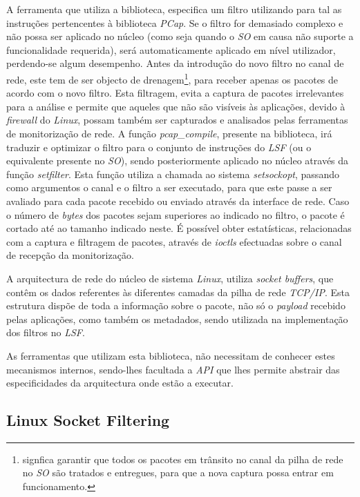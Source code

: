 A ferramenta que utiliza a biblioteca, especifica um filtro utilizando para tal as instruções pertencentes à biblioteca \textit{PCap}.
Se o filtro for demasiado complexo e não possa ser aplicado no núcleo (como seja quando o \textit{SO} em causa não suporte a funcionalidade requerida), será automaticamente aplicado em nível utilizador, perdendo-se algum desempenho.
Antes da introdução do novo filtro no canal de rede, este tem de ser objecto de drenagem\footnote{signfica garantir que todos os pacotes em trânsito no canal da pilha de rede no \textit{SO} são tratados e entregues, para que a nova captura possa entrar em funcionamento.}, para receber apenas os pacotes de acordo com o novo filtro.
Esta filtragem, evita a captura de pacotes irrelevantes para a análise e permite que aqueles que não são visíveis às aplicações, devido à \textit{firewall} do \textit{Linux}, possam também ser capturados e analisados pelas ferramentas de monitorização de rede.
A função \textit{pcap\_compile}, presente na biblioteca, irá traduzir e optimizar o filtro para o conjunto de instruções do \textit{LSF} (ou o equivalente presente no \textit{SO}), sendo posteriormente aplicado no núcleo através da função \textit{setfilter}.
Esta função utiliza a chamada ao sistema \textit{setsockopt}, passando como argumentos o canal e o filtro a ser executado, para que este passe a ser avaliado para cada pacote recebido ou enviado através da interface de rede.
Caso o número de \textit{bytes} dos pacotes sejam superiores ao indicado no filtro, o pacote é cortado até ao tamanho indicado neste.
É possível obter estatísticas, relacionadas com a captura e filtragem de pacotes, através de \textit{ioctls} efectuadas sobre o canal de recepção da monitorização.

A arquitectura de rede do núcleo de sistema \textit{Linux}, utiliza \textit{socket buffers}, que contêm os dados referentes às diferentes camadas da pilha de rede \textit{TCP/IP}.
Esta estrutura dispõe de toda a informação sobre o pacote, não só o \textit{payload} recebido pelas aplicações, como também os metadados, sendo utilizada na implementação dos filtros no \textit{LSF}.

As ferramentas que utilizam esta biblioteca, não necessitam de conhecer estes mecanismos internos, sendo-lhes facultada a \textit{API} que lhes permite abstrair das especificidades da arquitectura onde estão a executar.


\subsection{Linux Socket Filtering}

